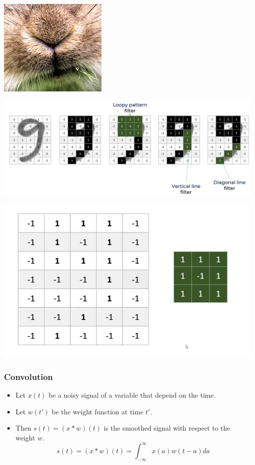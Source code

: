\documentclass[12pt,aspectratio=169]{beamer}
\begin{document}
\begin{frame}
\begin{center}
\includegraphics[scale=0.3]{nose}
\end{center}
\end{frame}


\begin{frame}
\begin{center}
\includegraphics[scale=0.4]{nine}
\end{center}
\end{frame}


\begin{frame}
\begin{center}
\includegraphics[scale=0.4]{nine2}
\end{center}
\end{frame}

\begin{frame}
\frametitle{Convolution}
\begin{itemize}
\item Let $x(t)$ be a noisy signal of a variable that depend on the time.
\smallskip
\item Let $w(t')$ be the weight function at time $t'$.
\smallskip
\item Then $s(t)=(x*w)(t)$ is the smoothed signal with respect to the weight $w$.
\[
s(t)=(x*w)(t)=\int_{-\infty}^{\infty}x(a)w(t-a)da
\]
\end{itemize}
\end{frame}
\end{document}
